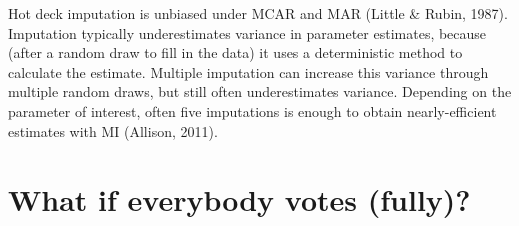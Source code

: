\documentclass[12pt,twoside]{reedthesis}
\begin{document}
Hot deck imputation is unbiased under MCAR and MAR (Little \& Rubin, 1987). Imputation typically underestimates variance in parameter estimates, because (after a random draw to fill in the data) it uses a deterministic method to calculate the estimate. Multiple imputation can increase this variance through multiple random draws, but still often underestimates variance. Depending on the parameter of interest, often five imputations is enough to obtain nearly-efficient estimates with MI (Allison, 2011).

\hypertarget{what-if-everybody-votes-fully}{%
\section{What if everybody votes (fully)?}\label{what-if-everybody-votes-fully}}
\end{document}
